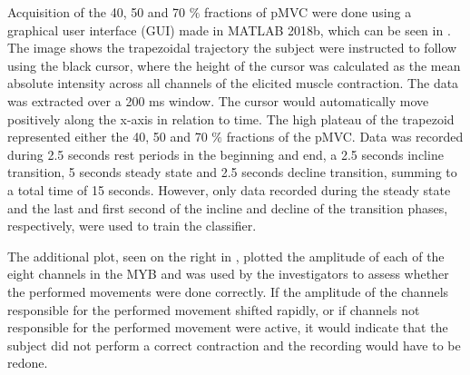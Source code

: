 Acquisition of the 40, 50 and 70 $\percent$ fractions of pMVC were done using a graphical user interface (GUI) made in MATLAB 2018b, which can be seen in . The image shows the trapezoidal trajectory the subject were instructed to follow using the black cursor, where the height of the cursor was calculated as the mean absolute intensity across all channels of the elicited muscle contraction. The data was extracted over a 200 ms window. The cursor would automatically move positively along the x-axis in relation to time. The high plateau of the trapezoid represented either the 40, 50 and 70 $\percent$ fractions of the pMVC. Data was recorded during 2.5 seconds rest periods in the beginning and end, a 2.5 seconds incline transition, 5 seconds steady state and 2.5 seconds decline transition, summing to a total time of 15 seconds. However, only data recorded during the steady state and the last and first second of the incline and decline of the transition phases, respectively, were used to train the classifier. 

The additional plot, seen on the right in , plotted the amplitude of each of the eight channels in the MYB and was used by the investigators to assess whether the performed movements were done correctly. If the amplitude of the channels responsible for the performed movement shifted rapidly, or if channels not responsible for the performed movement were active, it would indicate that the subject did not perform a correct contraction and the recording would have to be redone.   
   
   
